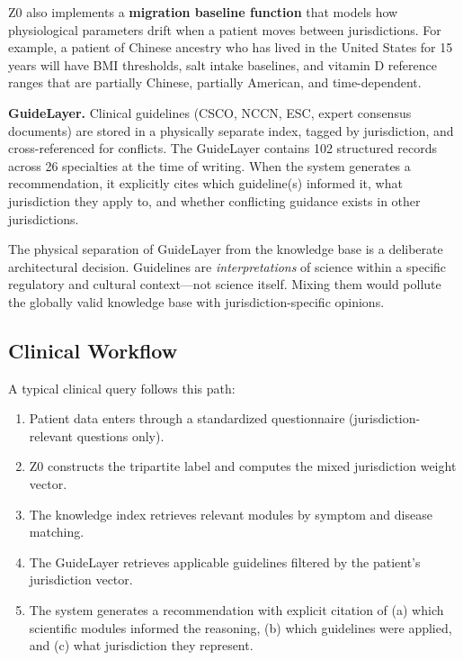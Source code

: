 \documentclass[11pt]{article}
\begin{document}
Z0 also implements a \textbf{migration baseline function} that models how 
physiological parameters drift when a patient moves between jurisdictions. 
For example, a patient of Chinese ancestry who has lived in the United 
States for 15 years will have BMI thresholds, salt intake baselines, and 
vitamin D reference ranges that are partially Chinese, partially American, 
and time-dependent.

\textbf{GuideLayer.} Clinical guidelines (CSCO, NCCN, ESC, expert consensus 
documents) are stored in a physically separate index, tagged by jurisdiction, 
and cross-referenced for conflicts. The GuideLayer contains 102 structured 
records across 26 specialties at the time of writing. When the system 
generates a recommendation, it explicitly cites which guideline(s) informed 
it, what jurisdiction they apply to, and whether conflicting guidance 
exists in other jurisdictions.

The physical separation of GuideLayer from the knowledge base is a 
deliberate architectural decision. Guidelines are \textit{interpretations} 
of science within a specific regulatory and cultural context---not science 
itself. Mixing them would pollute the globally valid knowledge base with 
jurisdiction-specific opinions.

\subsection{Clinical Workflow}

A typical clinical query follows this path:

\begin{enumerate}[leftmargin=*]
    \item Patient data enters through a standardized questionnaire 
    (jurisdiction-relevant questions only).
    \item Z0 constructs the tripartite label and computes the mixed 
    jurisdiction weight vector.
    \item The knowledge index retrieves relevant modules by symptom and 
    disease matching.
    \item The GuideLayer retrieves applicable guidelines filtered by the 
    patient's jurisdiction vector.
    \item The system generates a recommendation with explicit citation 
    of (a) which scientific modules informed the reasoning, (b) which 
    guidelines were applied, and (c) what jurisdiction they represent.
\end{enumerate}
\end{document}
